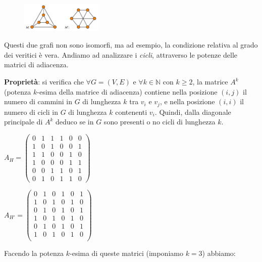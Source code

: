 \begin{flushleft}
    \begin{figure}[h]
        \centering
        \includegraphics[width=0.35\textwidth]{img/no_isomorfi}
    \end{figure}
    Questi due grafi non sono isomorfi, ma ad esempio, la condizione relativa al grado dei veritici è vera. Andiamo ad analizzare i \textit{cicli}, attraverso le potenze delle matrici di adiacenza.

    \textbf{Proprietà}: si verifica che $\forall G = (V, E)$ e $\forall k \in \mathbb{N}$ con $k \geq 2$, la matrice $A^k$ (potenza $k$-esima della matrice di adiacenza) contiene nella posizione $(i, j)$ il numero di cammini in $G$ di lunghezza $k$ tra $v_i$ e $v_j$, e nella posizione $(i, i)$ il numero di cicli in $G$ di lunghezza $k$ contenenti $v_i$. Quindi, dalla diagonale principale di $A^k$ deduco se in $G$ sono presenti o no cicli di lunghezza $k$.
    
    {\centering
        \begin{minipage}[t]{0.45\textwidth}
            \centering
            $A_H = \left(\begin{array}{cccccc} 
                0 & 1 & 1 & 1 & 0 & 0 \\
                1 & 0 & 1 & 0 & 0 & 1 \\ 
                1 & 1 & 0 & 0 & 1 & 0 \\
                1 & 0 & 0 & 0 & 1 & 1 \\
                0 & 0 & 1 & 1 & 0 & 1 \\
                0 & 1 & 0 & 1 & 1 & 0
            \end{array}\right)$
        \end{minipage}
        \begin{minipage}[t]{0.45\textwidth}
            \centering
            $A_{H'} = \left(\begin{array}{cccccc} 
                0 & 1 & 0 & 1 & 0 & 1 \\
                1 & 0 & 1 & 0 & 1 & 0 \\
                0 & 1 & 0 & 1 & 0 & 1 \\
                1 & 0 & 1 & 0 & 1 & 0 \\
                0 & 1 & 0 & 1 & 0 & 1 \\
                1 & 0 & 1 & 0 & 1 & 0 \\
            \end{array}\right)$
        \end{minipage}
    \par}
    Facendo la potenza $k$-esima di queste matrici (imponiamo $k = 3$) abbiamo:


\end{flushleft}
